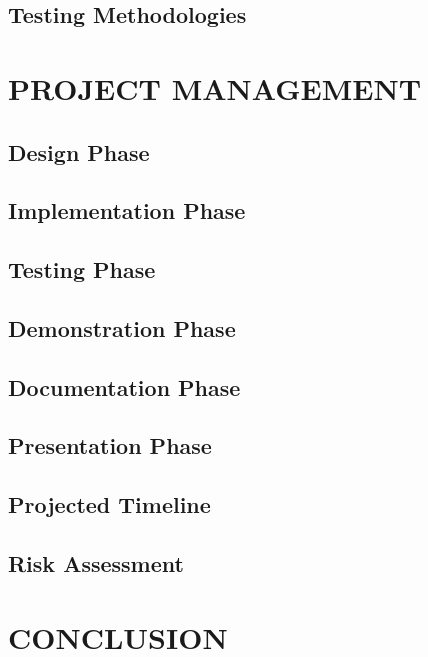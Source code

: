 \documentclass[10pt,twocolumn]{witseiepaper}
\begin{document}
	\subsection{Testing Methodologies}


\section{PROJECT MANAGEMENT}
	\subsection{Design Phase}
	
	\subsection{Implementation Phase}
	
	\subsection{Testing Phase}
	
	\subsection{Demonstration Phase}
	
	\subsection{Documentation Phase}
	
	\subsection{Presentation Phase}
	
	\subsection{Projected Timeline}
	
	\subsection{Risk Assessment}

\section{CONCLUSION}

{}

\end{document}
